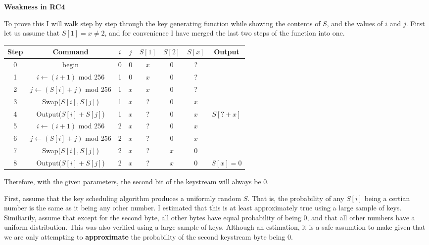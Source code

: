 \documentclass[12pt]{article}
\begin{document}
\begin{list}{.}{}
\item \textbf{Weakness in RC4}
\begin{list}{()}{}
\item To prove this I will walk step by step through the key generating function
while showing the contents of $S$, and the values of $i$ and $j$.  First let us
assume that $S[1] = x \neq 2$, and for convenience I have merged the last two
steps of the function into one.

\begin{center}
\begin{tabular}{| c | c || c | c | c | c | c | c |}
\hline
Step & Command & $i$ & $j$ & $S[1]$ & $S[2]$ & $S[x]$ & Output \\ \hline
0 & begin & 0 & 0 & $x$ & 0 & ? & \\ \hline
1 & $i \leftarrow (i+1)$ mod 256 & 1 & 0 & $x$ & 0 & ? & \\ \hline
2 & $j \leftarrow (S[i]+j)$ mod 256 & 1 & $x$ & $x$ & 0 & ? & \\ \hline
3 & Swap($S[i], S[j]$) & 1 & $x$ & ? & 0 & $x$ & \\ \hline
4 & Output($S[i] + S[j]$) & 1 & $x$ & ? & 0 & $x$ & $S[? + x]$ \\ \hline
\hline
5 & $i \leftarrow (i+1)$ mod 256 & 2 & $x$ & ? & 0 & $x$ & \\ \hline
6 & $j \leftarrow (S[i]+j)$ mod 256 & 2 & $x$ & ? & 0 & $x$ & \\ \hline
7 & Swap($S[i], S[j]$) & 2 & $x$ & ? & $x$ & 0 & \\ \hline
8 & Output($S[i] + S[j]$) & 2 & $x$ & ? & $x$ & 0 & $S[x] = 0$ \\ \hline
\end{tabular}
\end{center}

Therefore, with the given parameters, the second bit of the keystream will
always be 0.

\item First, assume that the key scheduling algorithm produces a uniformly
random $S$.  That is, the probability of any $S[i]$ being a certian number is
the same as it being any other number.  I estimated that this is at least
approximately true using a large sample of keys.  Similiarily, assume that
except for the second byte, all other bytes have equal probability of being 0,
and that all other numbers have a uniform distribution.  This was also verified
using a large sample of keys.  Although an estimation, it is a safe assumtion to
make given that we are only attempting to \textbf{approximate} the probability
of the second keystream byte being 0.


\end{list}
\end{list}
\end{document}
